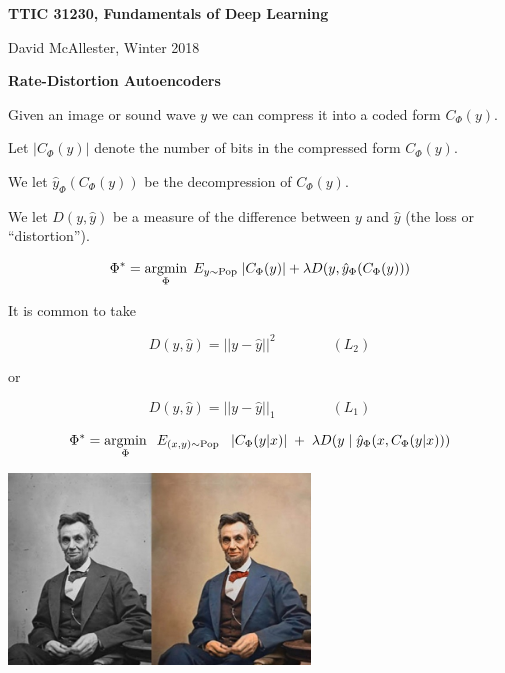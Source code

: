 



{\Huge

  \centerline{\bf TTIC 31230, Fundamentals of Deep Learning}
  \bigskip
  \centerline{David McAllester, Winter 2018}
  \vfill
  \centerline{\bf Rate-Distortion Autoencoders}
  \vfill






Given an image or sound wave $y$ we can compress it into a coded form $C_\Phi(y)$.

\vfill
Let $|C_\Phi(y)|$ denote the number of bits in the compressed form $C_\Phi(y)$.

\vfill
We let $\hat{y}_\Phi(C_\Phi(y))$ be the decompression of $C_\Phi(y)$.

\vfill
We let $D(y,\hat{y})$ be a measure of the difference between $y$ and $\hat{y}$ (the loss or ``distortion'').


$$\Phi^* = \operatorname*{argmin}_\Phi \;E_{y \sim \mathrm{Pop}}\;|C_\Phi(y)| + \lambda D(y,\hat{y}_\Phi(C_\Phi(y)))$$

\vfill
It is common to take

$$D(y,\hat{y}) = ||y-\hat{y}||^2 \hspace{4em}(L_2)$$

\vfill
or

$$D(y,\hat{y}) = ||y-\hat{y}||_1 \hspace{4em} (L_1)$$


$$\Phi^* = \operatorname*{argmin}_\Phi \;\;E_{(x,y) \sim \mathrm{Pop}} \;\;\; |C_\Phi(y|x)|\; + \; \lambda D(y\;|\;\hat{y}_\Phi(x,C_\Phi(y|x)))$$


\centerline{\includegraphics[height = 2in]{../images/colorization}}

}
